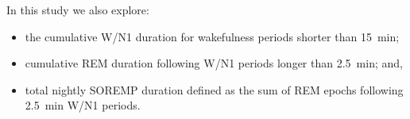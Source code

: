 In this study we also explore: 
\begin{itemize}
    \item the cumulative \ac{W}/\ac{N1} duration for wakefulness periods shorter than \SI{15}{\minute};
    \item cumulative \ac{REM} duration following \ac{W}/\ac{N1} periods longer than \SI{2.5}{\minute}; and,
    \item total nightly \ac{SOREMP} duration defined as the sum of \ac{REM} epochs following \SI{2.5}{\minute} \ac{W}/\ac{N1} periods.
\end{itemize}



